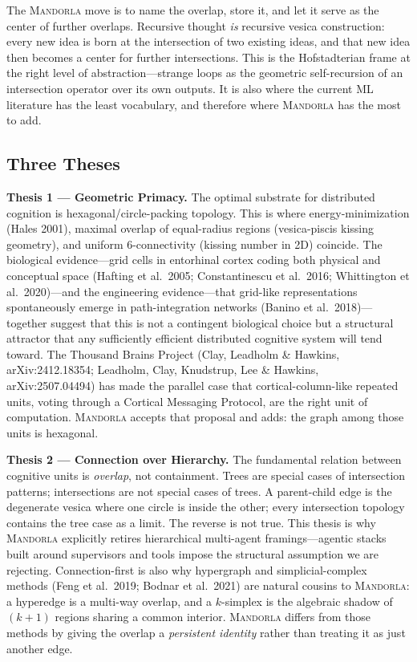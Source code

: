 \documentclass[11pt,a4paper]{article}
\begin{document}
The \textsc{Mandorla} move is to name the overlap, store it, and let it serve as the center of further overlaps. Recursive thought \emph{is} recursive vesica construction: every new idea is born at the intersection of two existing ideas, and that new idea then becomes a center for further intersections. This is the Hofstadterian frame at the right level of abstraction---strange loops as the geometric self-recursion of an intersection operator over its own outputs. It is also where the current ML literature has the least vocabulary, and therefore where \textsc{Mandorla} has the most to add.

\subsection{Three Theses}

\textbf{Thesis 1 --- Geometric Primacy.} The optimal substrate for distributed cognition is hexagonal/circle-packing topology. This is where energy-minimization (Hales 2001), maximal overlap of equal-radius regions (vesica-piscis kissing geometry), and uniform 6-connectivity (kissing number in 2D) coincide. The biological evidence---grid cells in entorhinal cortex coding both physical and conceptual space (Hafting et al.\ 2005; Constantinescu et al.\ 2016; Whittington et al.\ 2020)---and the engineering evidence---that grid-like representations spontaneously emerge in path-integration networks (Banino et al.\ 2018)---together suggest that this is not a contingent biological choice but a structural attractor that any sufficiently efficient distributed cognitive system will tend toward. The Thousand Brains Project (Clay, Leadholm \& Hawkins, arXiv:2412.18354; Leadholm, Clay, Knudstrup, Lee \& Hawkins, arXiv:2507.04494) has made the parallel case that cortical-column-like repeated units, voting through a Cortical Messaging Protocol, are the right unit of computation. \textsc{Mandorla} accepts that proposal and adds: the graph among those units is hexagonal.

\textbf{Thesis 2 --- Connection over Hierarchy.} The fundamental relation between cognitive units is \emph{overlap}, not containment. Trees are special cases of intersection patterns; intersections are not special cases of trees. A parent-child edge is the degenerate vesica where one circle is inside the other; every intersection topology contains the tree case as a limit. The reverse is not true. This thesis is why \textsc{Mandorla} explicitly retires hierarchical multi-agent framings---agentic stacks built around supervisors and tools impose the structural assumption we are rejecting. Connection-first is also why hypergraph and simplicial-complex methods (Feng et al.\ 2019; Bodnar et al.\ 2021) are natural cousins to \textsc{Mandorla}: a hyperedge is a multi-way overlap, and a $k$-simplex is the algebraic shadow of $(k+1)$ regions sharing a common interior. \textsc{Mandorla} differs from those methods by giving the overlap a \emph{persistent identity} rather than treating it as just another edge.
\end{document}

